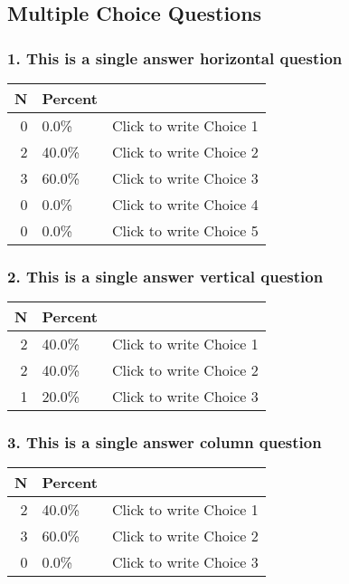 \documentclass{article}\usepackage[]{graphicx}\usepackage[]{color}
\begin{document}
\hfill \break \hfill \break
\subsection*{Multiple Choice Questions}
\subsubsection*{1.
This is a single answer horizontal question}

\begin{tabular}{r|l|l}
\hline
N & Percent & \\
\hline
0 & 0.0\% & Click to write Choice 1\\
\hline
2 & 40.0\% & Click to write Choice 2\\
\hline
3 & 60.0\% & Click to write Choice 3\\
\hline
0 & 0.0\% & Click to write Choice 4\\
\hline
0 & 0.0\% & Click to write Choice 5\\
\hline
\end{tabular}


\hfill \break \hfill \break
\subsubsection*{2.
This is a single answer vertical question}

\begin{tabular}{r|l|l}
\hline
N & Percent & \\
\hline
2 & 40.0\% & Click to write Choice 1\\
\hline
2 & 40.0\% & Click to write Choice 2\\
\hline
1 & 20.0\% & Click to write Choice 3\\
\hline
\end{tabular}


\hfill \break \hfill \break
\subsubsection*{3.
This is a single answer column question}

\begin{tabular}{r|l|l}
\hline
N & Percent & \\
\hline
2 & 40.0\% & Click to write Choice 1\\
\hline
3 & 60.0\% & Click to write Choice 2\\
\hline
0 & 0.0\% & Click to write Choice 3\\
\hline
\end{tabular}
\end{document}

